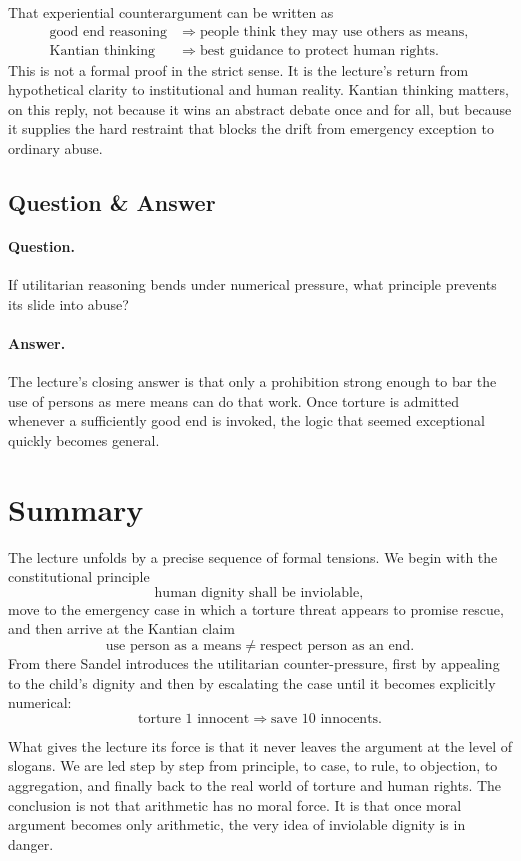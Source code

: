 That experiential counterargument can be written as
\begin{align}
\text{good end reasoning}
&\Longrightarrow
\text{people think they may use others as means},\\
\text{Kantian thinking}
&\Longrightarrow
\text{best guidance to protect human rights}.
\end{align}
This is not a formal proof in the strict sense. It is the lecture's return from hypothetical clarity to institutional and human reality. Kantian thinking matters, on this reply, not because it wins an abstract debate once and for all, but because it supplies the hard restraint that blocks the drift from emergency exception to ordinary abuse.

\subsection{Question \& Answer}

\paragraph{Question.} If utilitarian reasoning bends under numerical pressure, what principle prevents its slide into abuse?

\paragraph{Answer.} The lecture's closing answer is that only a prohibition strong enough to bar the use of persons as mere means can do that work. Once torture is admitted whenever a sufficiently good end is invoked, the logic that seemed exceptional quickly becomes general.

\section{Summary}

The lecture unfolds by a precise sequence of formal tensions. We begin with the constitutional principle
\begin{equation}
\text{human dignity shall be inviolable},
\end{equation}
move to the emergency case in which a torture threat appears to promise rescue, and then arrive at the Kantian claim
\begin{equation}
\text{use person as a means}
\neq
\text{respect person as an end}.
\end{equation}
From there Sandel introduces the utilitarian counter-pressure, first by appealing to the child's dignity and then by escalating the case until it becomes explicitly numerical:
\begin{equation}
\text{torture }1\text{ innocent}
\Longrightarrow
\text{save }10\text{ innocents}.
\end{equation}

What gives the lecture its force is that it never leaves the argument at the level of slogans. We are led step by step from principle, to case, to rule, to objection, to aggregation, and finally back to the real world of torture and human rights. The conclusion is not that arithmetic has no moral force. It is that once moral argument becomes only arithmetic, the very idea of inviolable dignity is in danger.